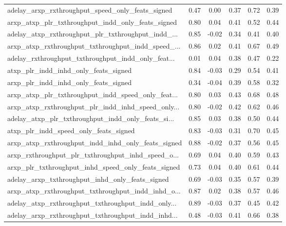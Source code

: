 \begin{tabular}{|l|*{4}{c}|r|}
adelay\_arxp\_rxthroughput\_speed\_only\_feats\_signed   & 0.47 &  0.00 &    0.37 &       0.72 &  0.39 \\
arxp\_atxp\_plr\_txthroughput\_indd\_only\_feats\_signed  & 0.80 &  0.04 &    0.41 &       0.52 &  0.44 \\
adelay\_atxp\_rxthroughput\_plr\_txthroughput\_indd\_... & 0.85 & -0.02 &    0.34 &       0.41 &  0.40 \\
arxp\_atxp\_rxthroughput\_txthroughput\_indd\_speed\_... & 0.86 &  0.02 &    0.41 &       0.67 &  0.49 \\
adelay\_rxthroughput\_txthroughput\_indd\_only\_feat... & 0.01 &  0.04 &    0.38 &       0.47 &  0.22 \\
atxp\_plr\_indd\_inhd\_only\_feats\_signed               & 0.84 & -0.03 &    0.29 &       0.54 &  0.41 \\
arxp\_plr\_indd\_inhd\_only\_feats\_signed               & 0.34 & -0.04 &    0.39 &       0.58 &  0.32 \\
arxp\_atxp\_plr\_txthroughput\_indd\_speed\_only\_feat... & 0.80 &  0.03 &    0.43 &       0.68 &  0.48 \\
arxp\_atxp\_rxthroughput\_plr\_indd\_inhd\_speed\_only... & 0.80 & -0.02 &    0.42 &       0.62 &  0.46 \\
adelay\_atxp\_plr\_txthroughput\_indd\_only\_feats\_si... & 0.85 &  0.03 &    0.38 &       0.50 &  0.44 \\
atxp\_plr\_indd\_speed\_only\_feats\_signed              & 0.83 & -0.03 &    0.31 &       0.70 &  0.45 \\
arxp\_atxp\_rxthroughput\_indd\_inhd\_only\_feats\_signed & 0.88 & -0.02 &    0.37 &       0.56 &  0.45 \\
arxp\_rxthroughput\_plr\_txthroughput\_inhd\_speed\_o... & 0.69 &  0.04 &    0.40 &       0.59 &  0.43 \\
arxp\_plr\_txthroughput\_inhd\_speed\_only\_feats\_signed & 0.73 &  0.04 &    0.40 &       0.61 &  0.44 \\
adelay\_arxp\_txthroughput\_inhd\_only\_feats\_signed    & 0.69 & -0.03 &    0.35 &       0.57 &  0.39 \\
arxp\_atxp\_rxthroughput\_txthroughput\_indd\_inhd\_o... & 0.87 &  0.02 &    0.38 &       0.57 &  0.46 \\
adelay\_atxp\_rxthroughput\_txthroughput\_indd\_only... & 0.89 & -0.03 &    0.37 &       0.45 &  0.42 \\
adelay\_arxp\_rxthroughput\_txthroughput\_indd\_inhd... & 0.48 & -0.03 &    0.41 &       0.66 &  0.38 \\

\end{tabular}
